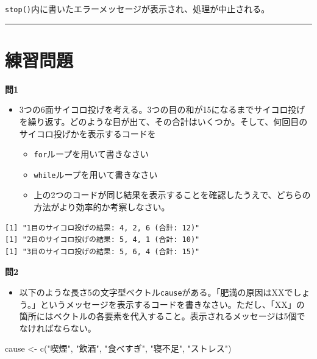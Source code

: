 \documentclass[
  a4paper,
  pandoc,
  ja=standard,
  jafont=haranoaji]{bxjsbook}
\newenvironment{Shaded}{\begin{snugshade}}{\end{snugshade}}
\newcommand{\FunctionTok}[1]{\textcolor[rgb]{0.28,0.35,0.67}{#1}}
\newcommand{\NormalTok}[1]{\textcolor[rgb]{0.00,0.48,0.65}{#1}}
\newcommand{\OtherTok}[1]{\textcolor[rgb]{0.00,0.48,0.65}{#1}}
\newcommand{\StringTok}[1]{\textcolor[rgb]{0.13,0.47,0.30}{#1}}
\providecommand{\tightlist}{%
  \setlength{\itemsep}{0pt}\setlength{\parskip}{0pt}}
\begin{document}
\texttt{stop()}内に書いたエラーメッセージが表示され、処理が中止される。

\begin{center}\rule{0.5\linewidth}{0.5pt}\end{center}

\hypertarget{sec-programming_exercise}{%
\section{練習問題}\label{sec-programming_exercise}}

\textbf{問1}

\begin{itemize}
\tightlist
\item
  3つの6面サイコロ投げを考える。3つの目の和が15になるまでサイコロ投げを繰り返す。どのような目が出て、その合計はいくつか。そして、何回目のサイコロ投げかを表示するコードを　

  \begin{itemize}
  \tightlist
  \item
    \texttt{for}ループを用いて書きなさい
  \item
    \texttt{while}ループを用いて書きなさい
  \item
    上の2つのコードが同じ結果を表示することを確認したうえで、どちらの方法がより効率的か考察しなさい。
  \end{itemize}
\end{itemize}

\begin{verbatim}
[1] "1目のサイコロ投げの結果: 4, 2, 6 (合計: 12)"
[1] "2目のサイコロ投げの結果: 5, 4, 1 (合計: 10)"
[1] "3目のサイコロ投げの結果: 5, 6, 4 (合計: 15)"
\end{verbatim}

\textbf{問2}

\begin{itemize}
\tightlist
\item
  以下のような長さ5の文字型ベクトル\texttt{cause}がある。「肥満の原因はXXでしょう。」というメッセージを表示するコードを書きなさい。ただし、「XX」の箇所にはベクトルの各要素を代入すること。表示されるメッセージは5個でなければならない。
\end{itemize}

\begin{Shaded}
\begin{Highlighting}[numbers=left,,]
\NormalTok{cause }\OtherTok{\textless{}{-}} \FunctionTok{c}\NormalTok{(}\StringTok{"喫煙"}\NormalTok{, }\StringTok{"飲酒"}\NormalTok{, }\StringTok{"食べすぎ"}\NormalTok{, }\StringTok{"寝不足"}\NormalTok{, }\StringTok{"ストレス"}\NormalTok{)}
\end{Highlighting}
\end{Shaded}
\end{document}
